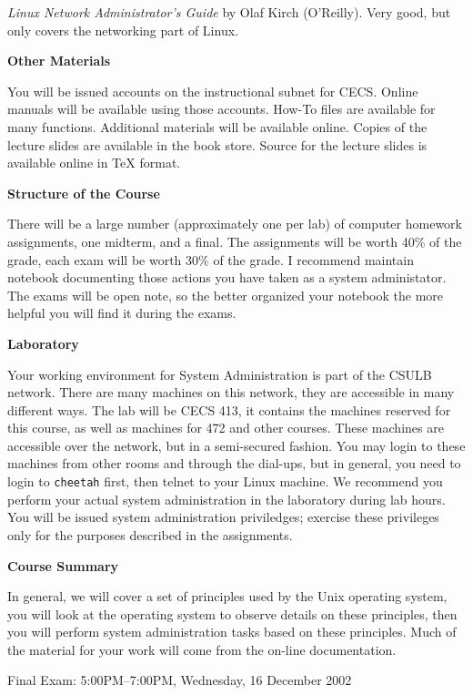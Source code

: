 {\it Linux Network Administrator's Guide} by Olaf Kirch (O'Reilly).
Very good, but only covers the networking part of Linux.

\vskip 5pt
\centerline{\bf Other Materials}

You will be issued accounts on the instructional subnet for CECS.
Online manuals will be available using those accounts.
How-To files are available for many functions.
Additional materials will be available online.
Copies of the lecture slides are available in the book store.
Source for the lecture slides is available online in TeX format.

\vskip 5pt
\centerline{\bf Structure of the Course}
 
There will be a large number (approximately one per lab) of computer 
homework assignments, one midterm, and a final.
The assignments will be worth 40\% of the grade,
each exam will be worth 30\% of the grade.
I recommend maintain notebook documenting those actions
you have taken as a system administator.
The exams will be open note, so the better organized your notebook
the more helpful you will find it during the exams.

\vskip 5pt
\centerline{\bf Laboratory}

Your working environment for System Administration is part of the CSULB network.
There are many machines on this network, they are accessible in
many different ways.
The lab will be CECS 413, it contains the machines reserved for this course,
as well as machines for 472 and other courses.
These machines are accessible over the network,
but in a semi-secured fashion.
You may login to these machines from other rooms
and through the dial-ups, but in general, you need to login to {\tt cheetah}
first, then telnet to your Linux machine.
We recommend you perform your actual system administration in the laboratory
during lab hours.
You will be issued system administration priviledges;
exercise these privileges only for the purposes described in the assignments.

\vskip 5pt
\centerline{\bf Course Summary}

In general, we will cover a set of principles used by the Unix operating system,
you will look at the operating system to observe details on these principles,
then you will perform system administration tasks based on these principles.
Much of the material for your work will come from the on-line documentation.

\vskip 5pt
Final Exam: 
5:00PM--7:00PM, Wednesday, 16 December 2002

{\parskip=0pt

\def\week#1{\par\hangindent 0.7in {\indent\llap{\bf #1 \enspace}
\ignorespaces}}

}
\bye
